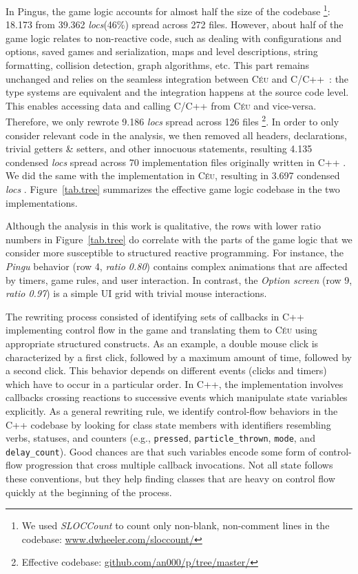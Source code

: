 \documentclass[times,twocolumn,final]{elsarticle}
\newcommand{\CEU}{\textsc{C\'{e}u}\xspace}
\newcommand{\locs}{\emph{locs}\xspace}
\newcommand{\code}[1] {{\small{\texttt{#1}}}}
\begin{document}
In Pingus, the game logic accounts for almost half the size of the codebase%
\footnote{
We used \emph{SLOCCount} to count only non-blank, non-comment lines in the
codebase: \url{www.dwheeler.com/sloccount/}
}:
18.173 from 39.362 \locs (46\%) spread across 272 files.
%
However, about half of the game logic relates to non-reactive code, such as
dealing with configurations and options, saved games and serialization, maps
and level descriptions, string formatting, collision detection, graph
algorithms, etc.
This part remains unchanged and relies on the seamless integration between \CEU
and C/C++~\cite{ceu.sensys13}: the type systems are equivalent and the
integration happens at the source code level.
This enables accessing data and calling C/C++ from \CEU and vice-versa.
%
Therefore, we only rewrote 9.186 \locs spread across 126 files%
\footnote{\label{codebase} Effective codebase: \url{github.com/an000/p/tree/master/}}.
%
In order to only consider relevant code in the analysis, we then removed all
headers, declarations, trivial getters \& setters, and other innocuous
statements, resulting 4.135 condensed \locs spread across 70 implementation
files originally written in C++%
\footnotemark[\ref{codebase}].
We did the same with the implementation in \CEU, resulting in 3.697 condensed
\locs%
\footnotemark[\ref{codebase}].
%
Figure~\ref{tab.tree} summarizes the effective game logic codebase in the two
implementations.

Although the analysis in this work is qualitative, the rows with lower ratio
numbers in Figure~\ref{tab.tree} do correlate with the parts of the game
logic that we consider more susceptible to structured reactive programming.
For instance, the \emph{Pingu} behavior (row 4, \emph{ratio 0.80}) contains
complex animations that are affected by timers, game rules, and user
interaction.
In contrast, the \emph{Option screen} (row 9, \emph{ratio 0.97}) is a simple UI
grid with trivial mouse interactions.

The rewriting process consisted of identifying sets of callbacks in C++
implementing control flow in the game and translating them to \CEU using
appropriate structured constructs.
%
As an example, a double mouse click is characterized by a first click, followed
by a maximum amount of time, followed by a second click.
This behavior depends on different events (clicks and timers) which have to
occur in a particular order.
In C++, the implementation involves callbacks crossing reactions to successive
events which manipulate state variables explicitly.
%
As a general rewriting rule, we identify control-flow behaviors in the C++
codebase by looking for class state members with identifiers resembling verbs,
statuses, and counters (e.g.,
\code{pressed},
\code{particle\_thrown},
\code{mode}, and
\code{delay\_count}).
Good chances are that such variables encode some form of control-flow
progression that cross multiple callback invocations.
%
Not all state follows these conventions, but they help finding classes that are
heavy on control flow quickly at the beginning of the process.
\end{document}

